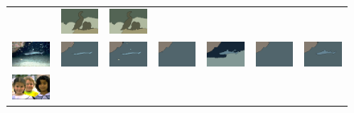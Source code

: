 \begin{figure}[tb]
\begin{center}
\begin{tabular}{ c  c  c  c  c  c  c }
&\includegraphics[width=2cm]{fig/visual_result/visual_result_3_6.png}
&\includegraphics[width=2cm]{fig/visual_result/visual_result_3_7.png}
\\
\includegraphics[width=2cm]{fig/visual_result/visual_result_4_1.png}
&\includegraphics[width=2cm]{fig/visual_result/visual_result_4_2.png}
&\includegraphics[width=2cm]{fig/visual_result/visual_result_4_3.png}
&\includegraphics[width=2cm]{fig/visual_result/visual_result_4_4.png}
&\includegraphics[width=2cm]{fig/visual_result/visual_result_4_5.png}
&\includegraphics[width=2cm]{fig/visual_result/visual_result_4_6.png}
&\includegraphics[width=2cm]{fig/visual_result/visual_result_4_7.png}
\\
\includegraphics[width=2cm]{fig/visual_result/visual_result_5_1.png}

\end{tabular}
\end{center}
\end{figure}
